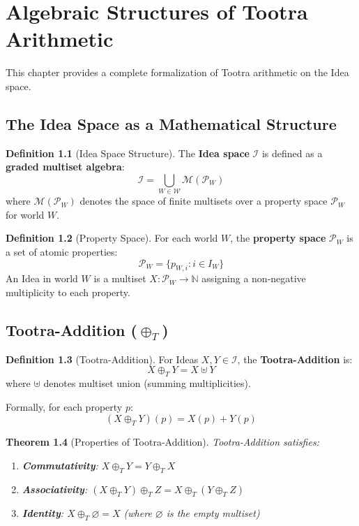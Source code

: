 \documentclass[11pt,twoside,openright]{book}
\theoremstyle{definition}
\newtheorem{definition}{Definition}[chapter]
\theoremstyle{plain}
\newtheorem{theorem}[definition]{Theorem}
\theoremstyle{remark}
\newcommand{\Worlds}{\mathcal{W}}
\newcommand{\Ideas}{\mathcal{I}}
\newcommand{\Tadd}{\oplus_T}
\begin{document}
\chapter{Algebraic Structures of Tootra Arithmetic}
\label{ch:tootra-arithmetic}

This chapter provides a complete formalization of Tootra arithmetic on the Idea space.

\section{The Idea Space as a Mathematical Structure}

\begin{definition}[Idea Space Structure]
\label{def:idea-structure}
The \textbf{Idea space} $\Ideas$ is defined as a \textbf{graded multiset algebra}:
\[
\Ideas = \bigcup_{W \in \Worlds} \mathcal{M}(\mathcal{P}_W)
\]
where $\mathcal{M}(\mathcal{P}_W)$ denotes the space of finite multisets over a property space $\mathcal{P}_W$ for world $W$.
\end{definition}

\begin{definition}[Property Space]
\label{def:property-space}
For each world $W$, the \textbf{property space} $\mathcal{P}_W$ is a set of atomic properties:
\[
\mathcal{P}_W = \{p_{W,i} : i \in I_W\}
\]
An Idea in world $W$ is a multiset $X : \mathcal{P}_W \to \mathbb{N}$ assigning a non-negative multiplicity to each property.
\end{definition}

\section{Tootra-Addition ($\Tadd$)}

\begin{definition}[Tootra-Addition]
\label{def:tootra-add}
For Ideas $X, Y \in \Ideas$, the \textbf{Tootra-Addition} is:
\[
X \Tadd Y = X \uplus Y
\]
where $\uplus$ denotes multiset union (summing multiplicities).

Formally, for each property $p$:
\[
(X \Tadd Y)(p) = X(p) + Y(p)
\]
\end{definition}

\begin{theorem}[Properties of Tootra-Addition]
\label{thm:tadd-properties}
Tootra-Addition satisfies:
\begin{enumerate}
  \item \textbf{Commutativity}: $X \Tadd Y = Y \Tadd X$
  \item \textbf{Associativity}: $(X \Tadd Y) \Tadd Z = X \Tadd (Y \Tadd Z)$
  \item \textbf{Identity}: $X \Tadd \varnothing = X$ (where $\varnothing$ is the empty multiset)
\end{enumerate}
\end{theorem}
\end{document}
